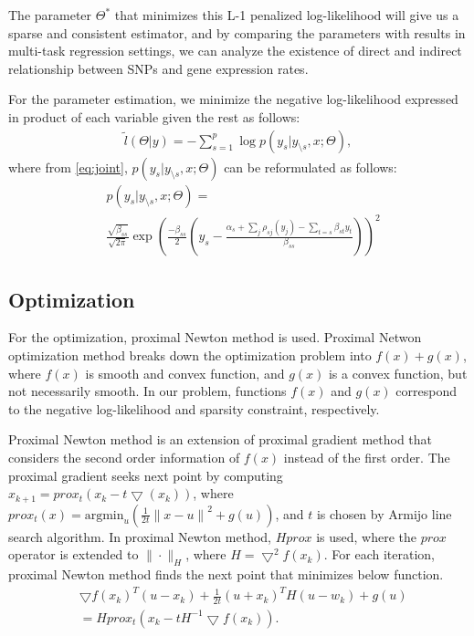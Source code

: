 \documentclass{article}
\begin{document}
The parameter $\Theta^*$ that minimizes this L-1 penalized log-likelihood will give us a sparse and consistent estimator, and by comparing the parameters with results in multi-task regression settings, we can analyze the existence of direct and indirect relationship between SNPs and gene expression rates.

For the parameter estimation, we minimize the negative log-likelihood expressed in product of each variable given the rest as follows:
\begin{align}
\tilde{l}(\Theta |y) = - \sum_{s=1}^{p} \log p(y_s |y_{\setminus s}, x;\Theta),
\end{align}
where from \ref{eq:joint}, $p(y_s |y_{\setminus s}, x;\Theta)$ can be reformulated as follows:
\begin{align}
&p(y_s |y_{\setminus s}, x;\Theta) =\nonumber    \\
& \frac{\sqrt{\beta_{ss}}}{\sqrt{2\pi}} \exp \left(\frac{-\beta_{ss}}{2} \left(y_s - \frac{\alpha_s + \sum_j \rho_{sj}(y_j)-\sum_{t=s}\beta_{st}y_t }{\beta_{ss}}\right) \right)^2
\end{align}




\subsection{Optimization}
For the optimization, proximal Newton method \cite{schmidt2010graphical,schmidt2011projected} is used. Proximal Netwon optimization method breaks down the optimization problem into $f(x) + g(x)$, where $f(x)$ is smooth and convex function, and $g(x)$ is a convex function, but not necessarily smooth. 
In our problem, functions $f(x)$ and $g(x)$ correspond to the negative log-likelihood and sparsity constraint, respectively.

Proximal Newton method is an extension of proximal gradient method that considers the second order information of $f(x)$ instead of the first order.
The proximal gradient seeks next point by computing $x_{k+1} = prox_t (x_k - t \bigtriangledown(x_k))$, where $prox_t(x)=\text{argmin}_u(\frac{1}{2t}{\|x-u\|}^2 + g(u))$, and $t$ is chosen by Armijo line search algorithm. In proximal Newton method, $Hprox$ is used, where the $prox$ operator is extended to $\| \cdot \|_H$, where $H=\bigtriangledown^2 f(x_k)$. For each iteration, proximal Newton method finds the next point that minimizes below function.
\begin{align}
  &\bigtriangledown f(x_k)^T(u-x_k)+\frac{1}{2t}(u+x_k)^TH(u-w_k)+g(u) \nonumber    \\
 & =  Hprox_t(x_k-tH^{-1}\bigtriangledown f(x_k)).
\end{align}
\end{document}
